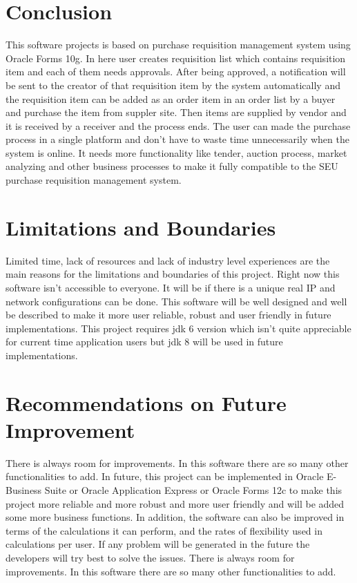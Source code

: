 \documentclass[12pt]{report} %
\begin{document}
\section*{Conclusion}
This software projects is based on purchase requisition management system using Oracle Forms 10g. In here user creates requisition list which contains requisition item and each of them needs approvals. After being approved, a notification will be sent to the creator of that requisition item by the system automatically and the requisition item can be added as an order item in an order list by a buyer and purchase the item from suppler site. Then items are supplied by vendor and it is received by a receiver and the process ends. The user can made the purchase process in a single platform and don't have to waste time unnecessarily when the system is online. It needs more functionality like tender, auction process, market analyzing and other business processes to make it fully compatible to the SEU purchase requisition management system.


\section*{Limitations and Boundaries}
Limited time, lack of resources and lack of industry level experiences are the main reasons for the limitations and boundaries of this project. Right now this software isn't accessible to everyone. It will be if there is a unique real IP and network configurations can be done. This software will be well designed and well be described to make it more user reliable, robust and user friendly in future implementations. This project requires jdk 6 version which isn't quite appreciable for current time application users but jdk 8 will be used in future implementations. 


\section*{Recommendations on Future Improvement}
\ifx
There is always room for improvements. In this software there are so many other functionalities to add. In future, this project can be implemented in Oracle E-Business Suite or Oracle Application Express or  Oracle Forms 12c to make this project more reliable and more robust and more user friendly and will be added some more business functions. In addition, the software can also be improved in terms of the calculations it can perform, and the rates of flexibility used in calculations per user. If any problem will be generated in the future the developers will try best to solve the issues. 
\fi
There is always room for improvements. In this software there are so many other functionalities to add.
\end{document}
